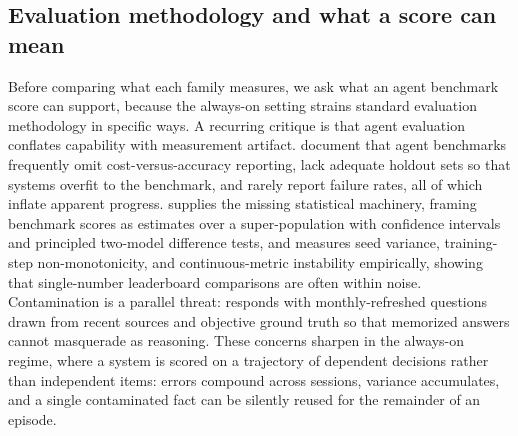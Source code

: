 \subsection{Evaluation methodology and what a score can mean}

Before comparing what each family measures, we ask what an agent benchmark score can support, because the always-on setting strains standard evaluation methodology in specific ways. A recurring critique is that agent evaluation conflates capability with measurement artifact. \citet{kapoor2024aiagentsthatmatter} document that agent benchmarks frequently omit cost-versus-accuracy reporting, lack adequate holdout sets so that systems overfit to the benchmark, and rarely report failure rates, all of which inflate apparent progress. \citet{miller2024errorbarsevals} supplies the missing statistical machinery, framing benchmark scores as estimates over a super-population with confidence intervals and principled two-model difference tests, and \citet{madaan2024quantifyingvariance} measures seed variance, training-step non-monotonicity, and continuous-metric instability empirically, showing that single-number leaderboard comparisons are often within noise. Contamination is a parallel threat: \citet{white2024livebench} responds with monthly-refreshed questions drawn from recent sources and objective ground truth so that memorized answers cannot masquerade as reasoning. These concerns sharpen in the always-on regime, where a system is scored on a trajectory of dependent decisions rather than independent items: errors compound across sessions, variance accumulates, and a single contaminated fact can be silently reused for the remainder of an episode.

